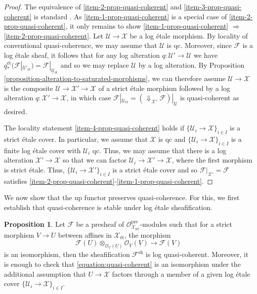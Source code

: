 \documentclass[11pt]{amsart}
\theoremstyle{definition}
\theoremstyle{definition}
\newtheorem{proposition}[theorem]{Proposition}
\DeclareMathOperator{\arrowdown}{\!\Downarrow\!}
\newcommand{\cF}{\mathcal{F}}
\newcommand{\cU}{\mathcal{U}}
\newcommand{\cX}{\mathcal{X}}
\newcommand{\ul}[1]{\underline{#1}}
\newcommand{\cal}{\mathcal}
\def\cF{{\cal F}}
\def\cU{{\cal U}}
\def\cX{{\cal X}}
\begin{document}
\begin{proof}
The equivalence of \eqref{item-2-prop-quasi-coherent} and \eqref{item-3-prop-quasi-coherent} is standard \cite[0GZX]{stacks}. As \eqref{item-1-prop-quasi-coherent} is a special case of \eqref{item-2-prop-quasi-coherent}, it only remains to show \eqref{item-1-prop-quasi-coherent} $\Rightarrow$ \eqref{item-2-prop-quasi-coherent}. Let $\mathcal{U}\rightarrow \mathcal{X}$ be a log \'etale morphism. By locality of conventional quasi-coherence, we may assume that $\mathcal{U}$ is qc. Moreover, since $\cF$ is a log \'etale sheaf, it follows that for any log alteration $q\colon \mathcal{U}'\rightarrow \mathcal{U}$ we have $\ul{q}{}^{\text{\'et}}_*(\mathcal{F}|_{\ul{\mathcal{U}}{}'_{\text{\'et}}} )= \mathcal{F}|_{\ul{\mathcal{U}}{}_{\text{\'et}}}$ and so we may replace $\mathcal{U}$ by a log alteration. By Proposition \ref{proposition-alteration-to-saturated-morphisms}, we can therefore assume $\mathcal{U}\rightarrow\mathcal{X}$ is the composite $\mathcal{U}\rightarrow\mathcal{X}'\rightarrow\mathcal{X}$ of a strict \'etale morphism followed by a log alteration $q\colon \cX'\rightarrow\cX$, in which case $\mathcal{F}|_{\ul{\mathcal{U}}{}_{\text{\'et}}} = (\arrowdown_{\cX'}\cF )|_{\ul{\cU}}$ is quasi-coherent as desired.

The locality statement \eqref{item-4-prop-quasi-coherent} holds if $\{\mathcal{U}_i\rightarrow \mathcal{X}\}_{i\in I}$ is a strict \'etale cover. In particular, we assume that $\mathcal{X}$ is qc and $\{\mathcal{U}_i\rightarrow \mathcal{X}\}_{i\in I}$ is a finite log \'etale cover with $\mathcal{U}_i$ qc. Thus, we may assume that there is a log alteration $\mathcal{X}'\rightarrow \mathcal{X}$ so that we can factor $\mathcal{U}_i\rightarrow\mathcal{X}'\rightarrow\mathcal{X}$, where the first morphism is strict \'etale. Thus, $\{\mathcal{U}_i\rightarrow\mathcal{X}'\}_{i\in I}$ is a strict \'etale cover and so $\mathcal{F}|_{\mathcal{X}'}=\mathcal{F}$ satisfies \eqref{item-2-prop-quasi-coherent}-\eqref{item-1-prop-quasi-coherent}.
\end{proof}
We now show that the up functor preserves quasi-coherence. For this, we first establish that quasi-coherence is stable under log \'etale sheafification.
\begin{proposition}\label{prop:nifty}
Let $\mathcal{F}$ be a presheaf of $\mathcal{O}_{\mathcal{X}_{\text{l\'et}}}^{\text{pre}}$-modules such that for a strict morphism $V\rightarrow U$ between affines in $\mathcal{X}_{\text{\'et}}$, the morphism
\begin{equation}\label{equation:quasi-coherent}
\mathcal{F}(U)\otimes_{\mathcal{O}_{\ul{U}}(\ul{U})}\mathcal{O}_{\ul{V}}(\ul{V})\longrightarrow \mathcal{F}(V)    
\end{equation}
is an isomorphism, then the sheafification $\mathcal{F}^{\text{sh}}$ is log quasi-coherent. Moreover, it is enough to check that \eqref{equation:quasi-coherent} is an isomorphism under the additional assumption that $U\rightarrow \mathcal{X}$ factors through a member of a given log \'etale cover $\{\cU_i\rightarrow \mathcal{X}\}_{i\in I}$.
\end{proposition}
\end{document}
